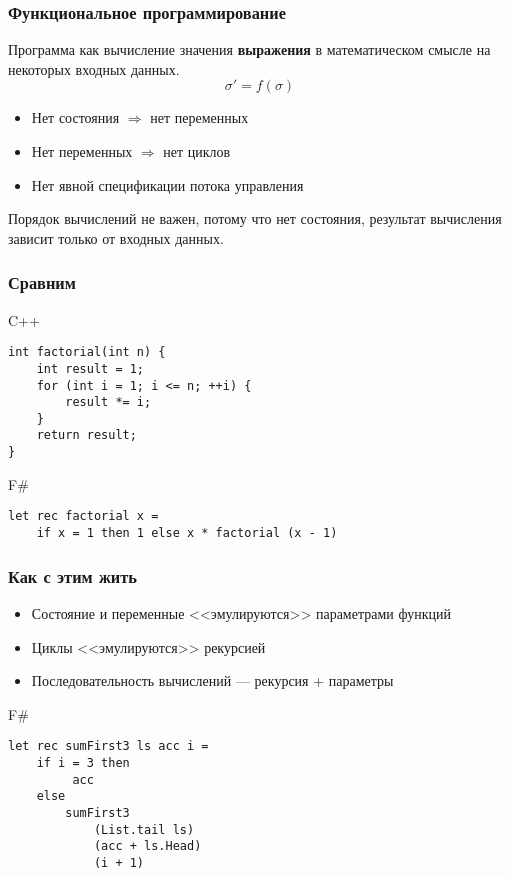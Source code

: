 \documentclass[xetex,mathserif,serif]{beamer}
\begin{document}
	\begin{frame}
		\frametitle{Функциональное программирование}
		Программа как вычисление значения \textbf{выражения} в математическом смысле на некоторых входных данных.
		$$\sigma' = f(\sigma)$$
	
		\begin{itemize}
			\item Нет состояния $\Rightarrow$ нет переменных
			\item Нет переменных $\Rightarrow$ нет циклов
			\item Нет явной спецификации потока управления
		\end{itemize}
		Порядок вычислений не важен, потому что нет состояния, результат вычисления зависит только от входных данных.
	\end{frame}
	
	\begin{frame}[fragile]
		\frametitle{Сравним}
		\begin{alertblock}{C++}
			\begin{verbatim}
int factorial(int n) {
    int result = 1;
    for (int i = 1; i <= n; ++i) {
        result *= i;
    }
    return result;
}
			\end{verbatim}
		\end{alertblock}
		\begin{exampleblock}{F\#}
			\begin{verbatim}
let rec factorial x =
    if x = 1 then 1 else x * factorial (x - 1)
            \end{verbatim}
		\end{exampleblock}
\end{frame}

	\begin{frame}[fragile]
		\frametitle{Как с этим жить}
		\begin{itemize}
			\item Состояние и переменные <<эмулируются>> параметрами функций
			\item Циклы <<эмулируются>> рекурсией
			\item Последовательность вычислений --- рекурсия + параметры
		\end{itemize}
		\begin{exampleblock}{F\#}
			\begin{verbatim}
let rec sumFirst3 ls acc i =
    if i = 3 then 
         acc 
    else 
        sumFirst3 
            (List.tail ls) 
            (acc + ls.Head) 
            (i + 1)
            \end{verbatim}
		\end{exampleblock}
\end{frame}
\end{document}
